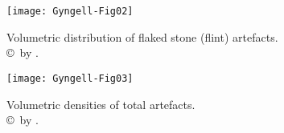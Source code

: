 \documentclass[%
	]{ijsra}
\begin{document}
\begin{figure}[!htb] %
\texttt{[image: Gyngell-Fig02]}
\caption{Volumetric distribution of flaked stone (flint) artefacts.
        {\normalfont\scriptsize \\ \copyright\ by 
 \textcite{Hardy-Smith_2004}.}}
\label{fig:Gyngell-Fig02}
\end{figure}

\begin{figure}[!htb]  %
\texttt{[image: Gyngell-Fig03]}
\caption{Volumetric densities of total artefacts.
        {\normalfont\scriptsize \\ \copyright\ by 
 \textcite{Hardy-Smith_2004}.
                  }}
\label{fig:Gyngell-Fig03}
\end{figure}
\end{document}
